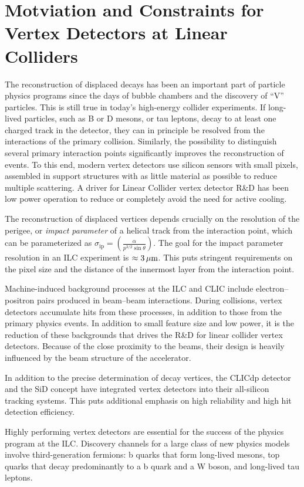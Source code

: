 \section{Motviation and Constraints for Vertex Detectors at Linear Colliders}

The reconstruction of displaced decays has been an important part of particle physics programs since the days of bubble chambers and the discovery of ``V'' particles. This is still true in today's high-energy collider experiments. If long-lived particles, such as B or D mesons, or tau leptons, decay to at least one charged track in the detector, they can in principle be resolved from the interactions of the primary collision. Similarly, the possibility to distinguish several primary interaction points significantly improves the reconstruction of events. To this end, modern vertex detectors use silicon sensors with small pixels, assembled in support structures with as little material as possible to reduce multiple scattering. A driver for Linear Collider vertex detector R\&D has been low power operation to reduce or completely avoid the need for active cooling.

The reconstruction of displaced vertices depends crucially on the resolution of the perigee, or \emph{impact parameter} of a helical track from the interaction point, which can be parameterized as $\sigma_\text{ip} = \left(\frac{\alpha}{p^{3/2}\sin\theta}\right).$
The goal for the impact parameter resolution in an ILC experiment is $\approx\unit[3]{\micron}$. This puts stringent requirements on the pixel size and the distance of the innermost layer from the interaction point.

Machine-induced background processes at the ILC and CLIC include electron--positron pairs produced in beam--beam interactions. During collisions, vertex detectors accumulate hits from these processes, in addition to those from the primary physics events. In addition to small feature size and low power, it is the reduction of these backgrounds that drives the R\&D for linear collider vertex detectors. Because of the close proximity to the beams, their design is heavily influenced by the beam structure of the accelerator.

In addition to the precise determination of decay vertices, the CLICdp detector and the SiD concept have integrated vertex detectors into their all-silicon tracking systems. This puts additional emphasis on high reliability and high hit detection efficiency.

Highly performing vertex detectors are essential for the success of the physics program at the ILC. Discovery channels for a large class of new physics models involve third-generation fermions: b quarks that form long-lived mesons, top quarks that decay predominantly to a b quark and a W boson, and long-lived tau leptons.
